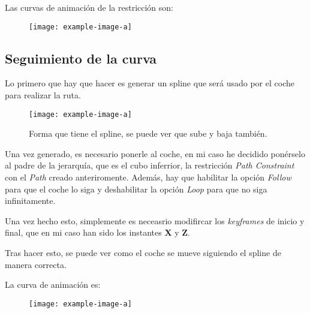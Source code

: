 Las curvas de animación de la restricción son:

\begin{figure}[H]
    \centering
   \texttt{[image: example-image-a]}
\end{figure}

\blindtext

\subsection{Seguimiento de la curva}

Lo primero que hay que hacer es generar un spline que será usado por el coche para realizar la ruta.

\begin{figure}[H]
    \centering
   \texttt{[image: example-image-a]}
   \caption{Forma que tiene el spline, se puede ver que sube y baja también.}
\end{figure}

Una vez generado, es necesario ponerle al coche, en mi caso he decidido ponérselo al padre de la jerarquía, que es el cubo inferrior, la restricción \textit{Path Constraint} con el \textit{Path} creado anteriromente. Además, hay que habilitar la opción \textit{Follow} para que el coche lo siga y deshabilitar la opción \textit{Loop} para que no siga infinitamente.

\bigskip

Una vez hecho esto, simplemente es neceasrio modifircar los \textit{keyframes} de inicio y final, que en mi caso han sido los instantes \textbf{X} y \textbf{Z}.

\bigskip

Tras hacer esto, se puede ver como el coche se mueve siguiendo el spline de manera correcta.

\bigskip

La curva de animación es:

\begin{figure}[H]
    \centering
   \texttt{[image: example-image-a]}
\end{figure}

\blindtext

